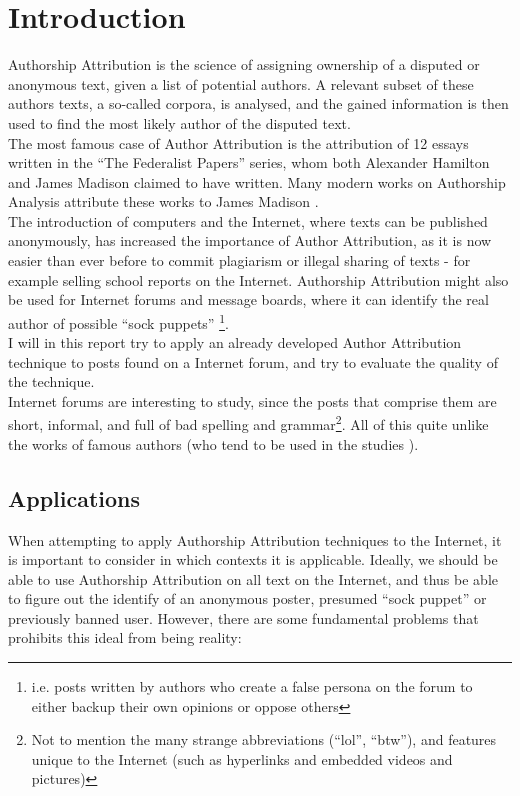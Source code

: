 \section{Introduction}
\label{introduction}
Authorship Attribution is the science of assigning ownership of a disputed or anonymous text, given a list of potential authors. A relevant subset of these authors texts, a so-called corpora, is analysed, and the gained information is then used to find the most likely author of the disputed text.\\

The most famous case of Author Attribution is the attribution of 12 essays written in the ``The Federalist Papers'' series, whom both Alexander Hamilton and James Madison claimed to have written. Many modern works on Authorship Analysis attribute these works to James Madison \cite{Fung03thedisputed}.\\
 The introduction of computers and the Internet, where texts can be published anonymously, has increased the importance of Author Attribution, as it is now easier than ever before to commit plagiarism or illegal sharing of texts - for example selling school reports on the Internet. Authorship Attribution might also be used for Internet forums and message boards, where it can identify the real author of possible ``sock puppets'' \footnote{i.e. posts written by authors who create a false persona on the forum to either backup their own opinions or oppose others}.\\ 

I will in this report try to apply an already developed Author Attribution technique to posts found on a Internet forum, and try to evaluate the quality of the technique.\\

Internet forums are interesting to study, since the posts that comprise them are short, informal, and full of bad spelling and grammar\footnote{Not to mention the many strange abbreviations (``lol'', ``btw''), and features unique to the Internet (such as hyperlinks and embedded videos and pictures)}. All of this quite unlike the works of famous authors (who tend to be used in the studies \cite{nr4}). 

\subsection{Applications}
When attempting to apply Authorship Attribution techniques to the Internet, it is important to consider in which contexts it is applicable. Ideally, we should be able to use Authorship Attribution on all text on the Internet, and thus be able to figure out the identify of an anonymous poster, presumed ``sock puppet'' or previously banned user. However, there are some fundamental problems that prohibits this ideal from being reality:

